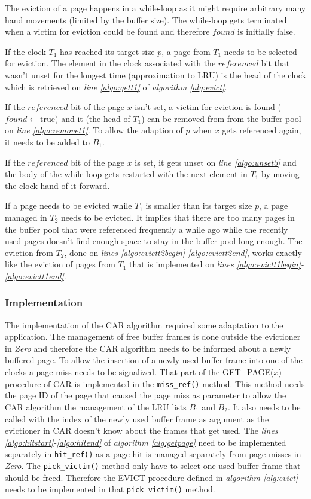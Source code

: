     The eviction of a page happens in a while-loop as it might require arbitrary many hand movements (limited by the buffer size). The while-loop gets terminated when a victim for eviction could be found and therefore $found$ is initially false.

    If the clock $T_1$ has reached its target size $p$, a page from $T_1$ needs to be selected for eviction. The element in the clock associated with the $referenced$ bit that wasn't unset for the longest time (approximation to LRU) is the head of the clock which is retrieved on \emph{line \ref{algo:gett1}} of \emph{algorithm \ref{alg:evict}}.

    If the $referenced$ bit of the page $x$ isn't set, a victim for eviction is found ($found \leftarrow \text{true}$) and it (the head of $T_1$) can be removed from from the buffer pool on \emph{line \ref{algo:removet1}}. To allow the adaption of $p$ when $x$ gets referenced again, it needs to be added to $B_1$.

    If the $referenced$ bit of the page $x$ is set, it gets unset on \emph{line \ref{algo:unset3}} and the body of the while-loop gets restarted with the next element in $T_1$ by moving the clock hand of it forward.

    If a page needs to be evicted while $T_1$ is smaller than its target size $p$, a page managed in $T_2$ needs to be evicted. It implies that there are too many pages in the buffer pool that were referenced frequently a while ago while the recently used pages doesn't find enough space to stay in the buffer pool long enough. The eviction from $T_2$, done on \emph{lines \ref{algo:evictt2begin}-\ref{algo:evictt2end}}, works exactly like the eviction of pages from $T_1$ that is implemented on \emph{lines \ref{algo:evictt1begin}-\ref{algo:evictt1end}}.

\subsubsection{Implementation}

    The implementation of the CAR algorithm required some adaptation to the application. The management of free buffer frames is done outside the evictioner in \emph{Zero} and therefore the CAR algorithm needs to be informed about a newly buffered page. To allow the insertion of a newly used buffer frame into one of the clocks a page miss needs to be signalized. That part of the GET\_PAGE($x$) procedure of CAR is implemented in the \lstinline{miss_ref()} method. This method needs the page ID of the page that caused the page miss as parameter to allow the CAR algorithm the management of the LRU lists $B_1$ and $B_2$. It also needs to be called with the index of the newly used buffer frame as argument as the evictioner in CAR doesn't know about the frames that get used. The \emph{lines \ref{algo:hitstart}-\ref{algo:hitend}} of \emph{algorithm \ref{alg:getpage}} need to be implemented separately in \lstinline{hit_ref()} as a page hit is managed separately from page misses in \emph{Zero}. The \lstinline{pick_victim()} method only have to select one used buffer frame that should be freed. Therefore the EVICT procedure defined in \emph{algorithm \ref{alg:evict}} needs to be implemented in that \lstinline{pick_victim()} method.

